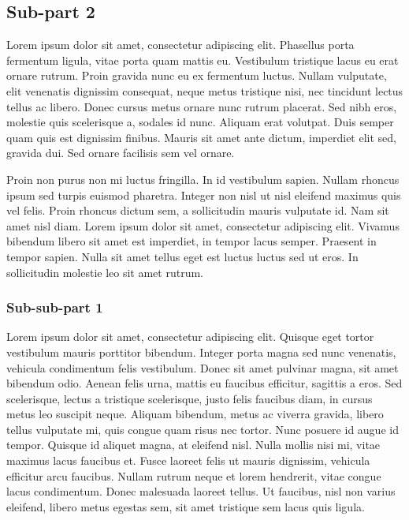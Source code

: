 \documentclass[a4paper,15pt]{article}
\begin{document}
\subsection{Sub-part 2}

Lorem ipsum dolor sit amet, consectetur adipiscing elit. Phasellus porta fermentum ligula, vitae porta quam mattis eu. Vestibulum tristique lacus eu erat ornare rutrum. Proin gravida nunc eu ex fermentum luctus. Nullam vulputate, elit venenatis dignissim consequat, neque metus tristique nisi, nec tincidunt lectus tellus ac libero. Donec cursus metus ornare nunc rutrum placerat. Sed nibh eros, molestie quis scelerisque a, sodales id nunc. Aliquam erat volutpat. Duis semper quam quis est dignissim finibus. Mauris sit amet ante dictum, imperdiet elit sed, gravida dui. Sed ornare facilisis sem vel ornare.

Proin non purus non mi luctus fringilla. In id vestibulum sapien. Nullam rhoncus ipsum sed turpis euismod pharetra. Integer non nisl ut nisl eleifend maximus quis vel felis. Proin rhoncus dictum sem, a sollicitudin mauris vulputate id. Nam sit amet nisl diam. Lorem ipsum dolor sit amet, consectetur adipiscing elit. Vivamus bibendum libero sit amet est imperdiet, in tempor lacus semper. Praesent in tempor sapien. Nulla sit amet tellus eget est luctus luctus sed ut eros. In sollicitudin molestie leo sit amet rutrum.

\subsubsection{Sub-sub-part 1}

Lorem ipsum dolor sit amet, consectetur adipiscing elit. Quisque eget tortor vestibulum mauris porttitor bibendum. Integer porta magna sed nunc venenatis, vehicula condimentum felis vestibulum. Donec sit amet pulvinar magna, sit amet bibendum odio. Aenean felis urna, mattis eu faucibus efficitur, sagittis a eros. Sed scelerisque, lectus a tristique scelerisque, justo felis faucibus diam, in cursus metus leo suscipit neque. Aliquam bibendum, metus ac viverra gravida, libero tellus vulputate mi, quis congue quam risus nec tortor. Nunc posuere id augue id tempor. Quisque id aliquet magna, at eleifend nisl. Nulla mollis nisi mi, vitae maximus lacus faucibus et. Fusce laoreet felis ut mauris dignissim, vehicula efficitur arcu faucibus. Nullam rutrum neque et lorem hendrerit, vitae congue lacus condimentum. Donec malesuada laoreet tellus. Ut faucibus, nisl non varius eleifend, libero metus egestas sem, sit amet tristique sem lacus quis ligula.
\end{document}
